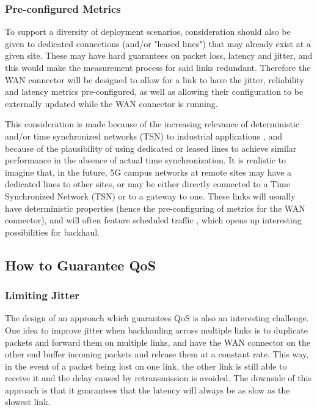 \subsubsection{Pre-configured Metrics}

To support a diversity of deployment scenarios, consideration should also be given to dedicated connections (and/or "leased lines") that may already exist at a given site. These may have hard guarantees on packet loss, latency and jitter, and this would make the measurement process for said links redundant. Therefore the WAN connector will be designed to allow for a link to have the jitter, reliability and latency metrics pre-configured, as well as allowing their configuration to be externally updated while the WAN connector is running.

This consideration is made because of the increasing relevance of deterministic and/or time synchronized networks (TSN) to industrial applications \cite{finn2019deterministic, zand2012wireless, tschoke2021time}, and because of the plausibility of using dedicated or leased lines to achieve similar performance \cite{tschoke2021time} in the absence of actual time synchronization. It is realistic to imagine that, in the future, 5G campus networks at remote sites may have a dedicated lines to other sites, or may be either directly connected to a Time Synchronized Network (TSN) or to a gateway to one. These links will usually have deterministic properties (hence the pre-configuring of metrics for the WAN connector), and will often feature scheduled traffic \cite{finn2019deterministicarch}, which opens up interesting possibilities for backhaul.

\subsection{How to Guarantee QoS}

\subsubsection{Limiting Jitter}

The design of an approach which guarantees QoS is also an interesting challenge. One idea to improve jitter when backhauling across multiple links is to duplicate packets and forward them on multiple links, and have the WAN connector on the other end buffer incoming packets and release them at a constant rate. This way, in the event of a packet being lost on one link, the other link is still able to receive it and the delay caused by retransmission is avoided. The downside of this approach is that it guarantees that the latency will always be as slow as the slowest link.


